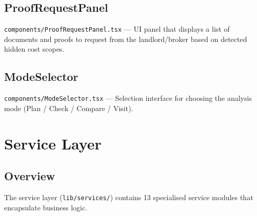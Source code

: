 \documentclass[12pt, a4paper, oneside]{report}
\newcommand{\filepath}[1]{\texttt{\small\color{codeblue}#1}}
\begin{document}
\section{ProofRequestPanel}

\filepath{components/ProofRequestPanel.tsx} --- UI panel that displays a list of documents and proofs to request from the landlord/broker based on detected hidden cost scopes.

\section{ModeSelector}

\filepath{components/ModeSelector.tsx} --- Selection interface for choosing the analysis mode (Plan / Check / Compare / Visit).


\chapter{Service Layer}

\section{Overview}

The service layer (\filepath{lib/services/}) contains 13 specialised service modules that encapsulate business logic.
\end{document}
